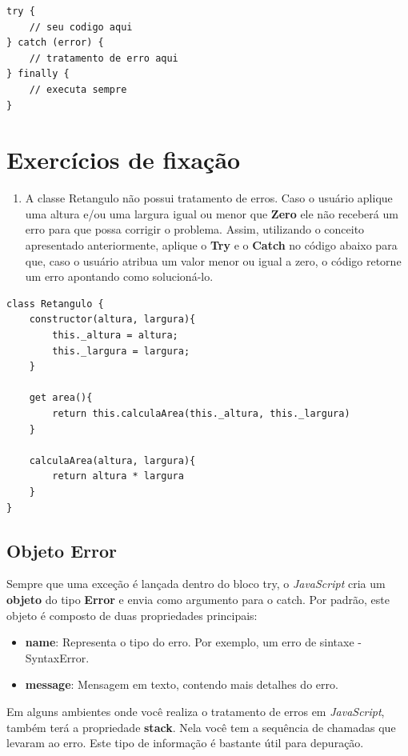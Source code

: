 \begin{verbatim}
try {
	// seu codigo aqui
} catch (error) {
	// tratamento de erro aqui
} finally {
	// executa sempre
}
\end{verbatim}

\section{Exercícios de fixação}

\begin{enumerate}
	\item A classe Retangulo não possui tratamento de erros. Caso o usuário aplique uma altura e/ou uma largura igual ou menor que \textbf{Zero} ele não receberá um erro para que possa corrigir o problema. Assim, utilizando o conceito apresentado anteriormente, aplique o \textbf{Try} e o \textbf{Catch} no código abaixo para que, caso o usuário atribua um valor menor ou igual a zero, o código retorne um erro apontando como solucioná-lo. 
\end{enumerate}

\begin{verbatim}
class Retangulo { 
	constructor(altura, largura){
		this._altura = altura;
		this._largura = largura;
	}	
	
	get area(){
		return this.calculaArea(this._altura, this._largura)
	}
	
	calculaArea(altura, largura){
		return altura * largura
	}
}
\end{verbatim}

\subsection{Objeto Error}
Sempre que uma exceção é lançada dentro do bloco try, o \textit{JavaScript} cria um \textbf{objeto} do tipo \textbf{Error} e envia como argumento para o catch. Por padrão, este objeto é composto de duas propriedades principais:

\begin{itemize}
	\item \textbf{name}: Representa o tipo do erro. Por exemplo, um erro de sintaxe - SyntaxError.
	\item \textbf{message}: Mensagem em texto, contendo mais detalhes do erro.
\end{itemize}	

Em alguns ambientes onde você realiza o tratamento de erros em \textit{JavaScript}, também terá a propriedade \textbf{stack}. Nela você tem a sequência de chamadas que levaram ao erro. Este tipo de informação é bastante útil para depuração.

